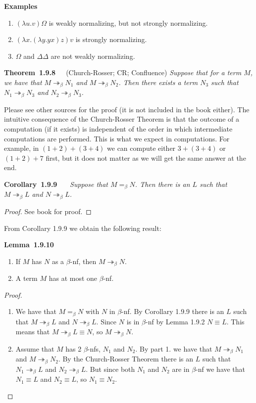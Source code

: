 \documentclass[letterpaper]{article}
\newenvironment{theorem}[2][]{\par\medskip
	\noindent \textbf{Theorem~#2}~~~#1 \rmfamily\em}{\medskip}
\newenvironment{lemma}[2][]{\par\medskip
	\noindent \textbf{Lemma~#2}~~~#1 \rmfamily\em}{\medskip}
\newenvironment{corollary}[2][]{\par\medskip
	\noindent \textbf{Corollary~#2}~~~#1 \rmfamily\em}{\medskip}
\newenvironment{examplesNonNum}[1][]{\par\medskip
	\noindent \textbf{Examples}~~~#1 \rmfamily}{\medskip}
\renewcommand{\l}{\lambda}
\newcommand{\beq}{=_\beta}
\newcommand{\bnf}{$\beta$-nf\xspace}
\newcommand{\betar}{\twoheadrightarrow_\beta}
\begin{document}
\begin{examplesNonNum}
	\begin{enumerate}
		\item $(\l u . v)\Omega$ is weakly normalizing, but not strongly normalizing.
		\item $(\l x. (\l y. y x)z)v$ is strongly normalizing.
		\item $\Omega$ and $\Delta \Delta$ are not weakly normalizing.
	\end{enumerate}
\end{examplesNonNum}


\begin{theorem}[(Church-Rosser; CR; Confluence)]{1.9.8}
	Suppose that for a term $M$, we have that $M \betar N_1$ and $M \betar N_2$. Then there exists a term $N_3$ such that $N_1 \betar N_3$ and $N_2 \betar N_3$.	
\end{theorem}

Please see other sources for the proof (it is not included in the book either). The intuitive consequence of the Church-Rosser Theorem is that the outcome of a computation (if it exists) is independent of the order in which intermediate computations are performed. This is what we expect in computations. For example, in $(1 + 2) + (3 + 4)$ we can compute either $3 + (3 + 4)$ or $(1 + 2) + 7$ first, but it does not matter as we will get the same answer at the end.

\begin{corollary}{1.9.9}
	Suppose that $M \beq N$. Then there is an $L$ such that $M \betar L$ and $N \betar L$.
\end{corollary}

\begin{proof}
	See book for proof.
\end{proof}

From Corollary 1.9.9 we obtain the following result:

\begin{lemma}{1.9.10}
	\begin{enumerate}
		\item If $M$ has $N$ as a \bnf, then $M \betar N$.
		\item A term $M$ has at most one \bnf.
	\end{enumerate}	
\end{lemma}

\begin{proof} $ $
	\begin{enumerate}
		\item We have that $M \beq N$ with $N$ in \bnf. By Corollary 1.9.9 there is an $L$ such that $M \betar L$ and $N \betar L$. Since $N$ is in \bnf by Lemma 1.9.2 $N \equiv L$. This means that $M \betar L \equiv N$, so $M \betar N$.
		\item Assume that $M$ has 2 $\beta$-nfs, $N_1$ and $N_2$. By part 1. we have that $M \betar N_1$ and $M \betar N_2$. By the Church-Rosser Theorem there is an $L$ such that $N_1 \betar L$ and $N_2 \betar L$. But since both $N_1$ and $N_2$ are in \bnf we have that $N_1 \equiv L$ and $N_2 \equiv L$, so $N_1 \equiv N_2$.
	\end{enumerate}
\end{proof}
\end{document}
